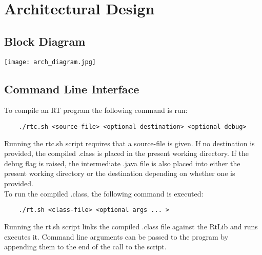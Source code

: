 \chapter{Architectural Design}

\section{Block Diagram}
\begin{center}
\texttt{[image: arch\_diagram.jpg]}
\end{center}

\section{Command Line Interface}
To compile an RT program the following command is run:
\begin{verbatim}
	./rtc.sh <source-file> <optional destination> <optional debug>
\end{verbatim}
Running the rtc.sh script requires that a source-file is given. If no destination is provided, the compiled .class
is placed in the present working directory. If the debug flag is raised, the intermediate .java file is 
also placed into either the present working directory or the destination depending on whether one 
is provided.\\
To run the compiled .class, the following command is executed:
\begin{verbatim}
	./rt.sh <class-file> <optional args ... >
\end{verbatim}
Running the rt.sh script links the compiled .class file against the RtLib and runs executes it. 
Command line arguments can be passed to the program by appending them to the end of the call
to the script.

